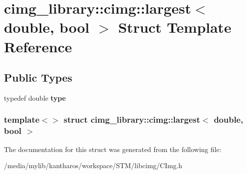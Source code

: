 \hypertarget{structcimg__library_1_1cimg_1_1largest_3_01double_00_01bool_01_4}{
\section{cimg\_\-library::cimg::largest$<$ double, bool $>$ Struct Template Reference}
\label{structcimg__library_1_1cimg_1_1largest_3_01double_00_01bool_01_4}
}
\subsection*{Public Types}
\begin{DoxyCompactItemize}
\item 
\hypertarget{structcimg__library_1_1cimg_1_1largest_3_01double_00_01bool_01_4_adb65664a632088edc37694eb916d2936}{
typedef double {\bfseries type}}
\label{structcimg__library_1_1cimg_1_1largest_3_01double_00_01bool_01_4_adb65664a632088edc37694eb916d2936}

\end{DoxyCompactItemize}
\subsubsection*{template$<$$>$ struct cimg\_\-library::cimg::largest$<$ double, bool $>$}



The documentation for this struct was generated from the following file:\begin{DoxyCompactItemize}
\item 
/media/mylib/kantharos/workspace/STM/libcimg/CImg.h\end{DoxyCompactItemize}
